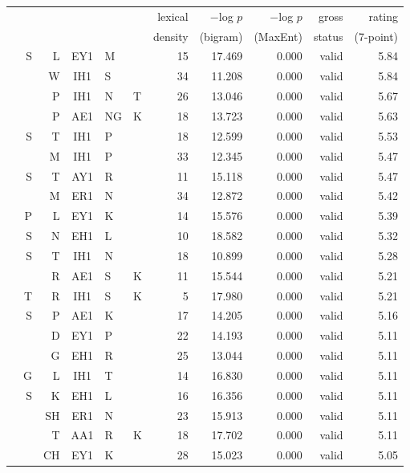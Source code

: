 \documentclass[12pt]{article}
\begin{document}
\begin{longtable}{r@{ }r@{ }r@{ }c@{ }l@{ }l@{ } rrrrr}
\toprule
   &    &    &    &    &   & lexical & $-$log $p$ & $-$log $p$ & gross  & rating    \\
   &    &    &    &    &   & density & (bigram)   & (MaxEnt)   & status & (7-point) \\
\midrule
  &  S &  L & EY1 & M  &    & 15 & 17.469 & 0.000 &   valid & 5.84 \\
  &    &  W & IH1 & S  &    & 34 & 11.208 & 0.000 &   valid & 5.84 \\
  &    &  P & IH1 & N  & T  & 26 & 13.046 & 0.000 &   valid & 5.67 \\
  &    &  P & AE1 & NG & K  & 18 & 13.723 & 0.000 &   valid & 5.63 \\
  &  S &  T & IH1 & P  &    & 18 & 12.599 & 0.000 &   valid & 5.53 \\
  &    &  M & IH1 & P  &    & 33 & 12.345 & 0.000 &   valid & 5.47 \\
  &  S &  T & AY1 & R  &    & 11 & 15.118 & 0.000 &   valid & 5.47 \\
  &    &  M & ER1 & N  &    & 34 & 12.872 & 0.000 &   valid & 5.42 \\
  &  P &  L & EY1 & K  &    & 14 & 15.576 & 0.000 &   valid & 5.39 \\
  &  S &  N & EH1 & L  &    & 10 & 18.582 & 0.000 &   valid & 5.32 \\
  &  S &  T & IH1 & N  &    & 18 & 10.899 & 0.000 &   valid & 5.28 \\
  &    &  R & AE1 & S  & K  & 11 & 15.544 & 0.000 &   valid & 5.21 \\
  &  T &  R & IH1 & S  & K  &  5 & 17.980 & 0.000 &   valid & 5.21 \\
  &  S &  P & AE1 & K  &    & 17 & 14.205 & 0.000 &   valid & 5.16 \\
  &    &  D & EY1 & P  &    & 22 & 14.193 & 0.000 &   valid & 5.11 \\
  &    &  G & EH1 & R  &    & 25 & 13.044 & 0.000 &   valid & 5.11 \\
  &  G &  L & IH1 & T  &    & 14 & 16.830 & 0.000 &   valid & 5.11 \\
  &  S &  K & EH1 & L  &    & 16 & 16.356 & 0.000 &   valid & 5.11 \\
  &    & SH & ER1 & N  &    & 23 & 15.913 & 0.000 &   valid & 5.11 \\
  &    &  T & AA1 & R  & K  & 18 & 17.702 & 0.000 &   valid & 5.11 \\
  &    & CH & EY1 & K  &    & 28 & 15.023 & 0.000 &   valid & 5.05 \\

\end{longtable}
\end{document}
